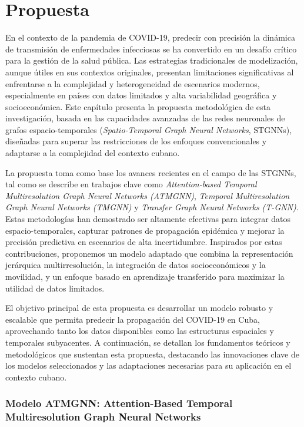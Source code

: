 \chapter{Propuesta}\label{chapter:proposal}

En el contexto de la pandemia de COVID-19, predecir con precisión la dinámica de transmisión de enfermedades infecciosas se ha convertido en un desafío crítico para la gestión de la salud pública. Las estrategias tradicionales de modelización, aunque útiles en sus contextos originales, presentan limitaciones significativas al enfrentarse a la complejidad y heterogeneidad de escenarios modernos, especialmente en países con datos limitados y alta variabilidad geográfica y socioeconómica. Este capítulo presenta la propuesta metodológica de esta investigación, basada en las capacidades avanzadas de las redes neuronales de grafos espacio-temporales (\textit{Spatio-Temporal Graph Neural Networks}, STGNNs), diseñadas para superar las restricciones de los enfoques convencionales y adaptarse a la complejidad del contexto cubano.

La propuesta toma como base los avances recientes en el campo de las STGNNs, tal como se describe en trabajos clave como \textit{Attention-based Temporal Multiresolution Graph Neural Networks (ATMGNN)}, \textit{Temporal Multiresolution Graph Neural Networks (TMGNN)} y \textit{Transfer Graph Neural Networks (T-GNN)}. Estas metodologías han demostrado ser altamente efectivas para integrar datos espacio-temporales, capturar patrones de propagación epidémica y mejorar la precisión predictiva en escenarios de alta incertidumbre. Inspirados por estas contribuciones, proponemos un modelo adaptado que combina la representación jerárquica multirresolución, la integración de datos socioeconómicos y la movilidad, y un enfoque basado en aprendizaje transferido para maximizar la utilidad de datos limitados.

El objetivo principal de esta propuesta es desarrollar un modelo robusto y escalable que permita predecir la propagación del COVID-19 en Cuba, aprovechando tanto los datos disponibles como las estructuras espaciales y temporales subyacentes. A continuación, se detallan los fundamentos teóricos y metodológicos que sustentan esta propuesta, destacando las innovaciones clave de los modelos seleccionados y las adaptaciones necesarias para su aplicación en el contexto cubano.

\subsection{Modelo ATMGNN: Attention-Based Temporal Multiresolution Graph Neural Networks}

